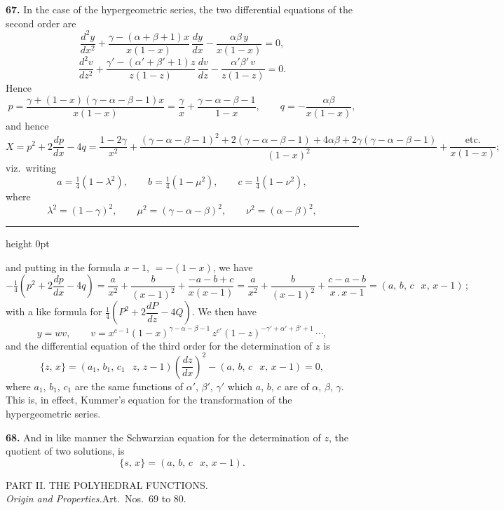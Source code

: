 \documentclass[11pt,a4paper]{article}
\newcommand{\artno}[1]{\textbf{#1.}\quad}
\begin{document}
\artno{67} In the case of the hypergeometric series, the two differential
equations of the second order are
\[
  \frac{d^{2}y}{dx^{2}} + \frac{\gamma - (\alpha+\beta+1)x}{x(1-x)}\,
   \frac{dy}{dx} - \frac{\alpha\beta\,y}{x(1-x)} = 0,
\]
\[
  \frac{d^{2}v}{dz^{2}} + \frac{\gamma' - (\alpha'+\beta'+1)z}{z(1-z)}\,
   \frac{dv}{dz} - \frac{\alpha'\beta'\,v}{z(1-z)} = 0.
\]
Hence
\[
  p = \frac{\gamma + (1-x)(\gamma - \alpha - \beta - 1)x}{x(1-x)}
    = \frac{\gamma}{x} + \frac{\gamma - \alpha - \beta - 1}{1-x},\qquad
  q = -\frac{\alpha\beta}{x(1-x)},
\]
and hence
\[
  X = p^{2} + 2\frac{dp}{dx} - 4q
    = \frac{1 - 2\gamma}{x^{2}} +
      \frac{(\gamma - \alpha - \beta - 1)^{2} + 2(\gamma - \alpha - \beta - 1)
            + 4\alpha\beta + 2\gamma(\gamma - \alpha - \beta - 1)}{(1-x)^{2}}
      + \frac{\text{etc.}}{x(1-x)};
\]
viz.\ writing
\[
  a = \tfrac{1}{4}(1 - \lambda^{2}),\qquad
  b = \tfrac{1}{4}(1 - \mu^{2}),\qquad
  c = \tfrac{1}{4}(1 - \nu^{2}),
\]
where
\[
  \lambda^{2} = (1 - \gamma)^{2},\qquad
  \mu^{2}     = (\gamma - \alpha - \beta)^{2},\qquad
  \nu^{2}     = (\alpha - \beta)^{2},
\]

\bigskip
\hrule height 0pt
\bigskip

and putting in the formula $x-1$, $=-(1-x)$, we have
\[
  -\tfrac{1}{4}\!\left(p^{2} + 2\frac{dp}{dx} - 4q\right)
  = \frac{a}{x^{2}} + \frac{b}{(x-1)^{2}} + \frac{-a - b + c}{x(x-1)}
  = \frac{a}{x^{2}} + \frac{b}{(x-1)^{2}} + \frac{c - a - b}{x\,.\,x-1}
  = (a,\,b,\,c\,\;\;x,\,x-1)\,;
\]
with a like formula for $\tfrac{1}{4}\!\left(P^{2} + 2\dfrac{dP}{dz} - 4Q\right)$.
We then have
\[
  y = wv,\qquad
  v = x^{c-1}(1-x)^{\gamma - \alpha - \beta - 1}\,
      z^{c'}(1-z)^{-\gamma'+\alpha'+\beta'+1}\,
      \dotsb,
\]
and the differential equation of the third order for the determination of
$z$ is
\[
  \{z,\,x\} = (a_{1},\,b_{1},\,c_{1}\,\;\;z,\,z-1)\!\left(\frac{dz}{dx}\right)^{\!2}
              - (a,\,b,\,c\,\;\;x,\,x-1) = 0,
\]
where $a_{1}$, $b_{1}$, $c_{1}$ are the same functions of $\alpha'$,
$\beta'$, $\gamma'$ which $a$, $b$, $c$ are of $\alpha$, $\beta$, $\gamma$.
This is, in effect, Kummer's equation for the transformation of the
hypergeometric series.

\artno{68} And in like manner the Schwarzian equation for the determination
of $z$, the quotient of two solutions, is
\[
  \{s,\,x\} = (a,\,b,\,c\,\;\;x,\,x-1).
\]

\begin{center}
\textsc{PART II. \quad THE POLYHEDRAL FUNCTIONS.}\\[3pt]
\textit{Origin and Properties.}\quad Art.\ Nos.\ 69 to 80.
\end{center}
\end{document}
